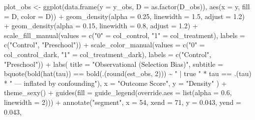 \documentclass[
  letterpaper,
  DIV=11,
  numbers=noendperiod]{scrreprt}
\newenvironment{Shaded}{\begin{snugshade}}{\end{snugshade}}
\newcommand{\AttributeTok}[1]{\textcolor[rgb]{0.40,0.45,0.13}{#1}}
\newcommand{\DecValTok}[1]{\textcolor[rgb]{0.68,0.00,0.00}{#1}}
\newcommand{\FloatTok}[1]{\textcolor[rgb]{0.68,0.00,0.00}{#1}}
\newcommand{\FunctionTok}[1]{\textcolor[rgb]{0.28,0.35,0.67}{#1}}
\newcommand{\NormalTok}[1]{\textcolor[rgb]{0.00,0.23,0.31}{#1}}
\newcommand{\OtherTok}[1]{\textcolor[rgb]{0.00,0.23,0.31}{#1}}
\newcommand{\SpecialCharTok}[1]{\textcolor[rgb]{0.37,0.37,0.37}{#1}}
\newcommand{\StringTok}[1]{\textcolor[rgb]{0.13,0.47,0.30}{#1}}
\begin{document}
\begin{Shaded}
\begin{Highlighting}[]
\NormalTok{plot\_obs }\OtherTok{\textless{}{-}} \FunctionTok{ggplot}\NormalTok{(}\FunctionTok{data.frame}\NormalTok{(}\AttributeTok{y =}\NormalTok{ y\_obs, }\AttributeTok{D =} \FunctionTok{as.factor}\NormalTok{(D\_obs)),}
\FunctionTok{aes}\NormalTok{(}\AttributeTok{x =}\NormalTok{ y, }\AttributeTok{fill =}\NormalTok{ D, }\AttributeTok{color =}\NormalTok{ D)) }\SpecialCharTok{+}
\FunctionTok{geom\_density}\NormalTok{(}\AttributeTok{alpha =} \FloatTok{0.25}\NormalTok{, }\AttributeTok{linewidth =} \FloatTok{1.5}\NormalTok{, }\AttributeTok{adjust =} \FloatTok{1.2}\NormalTok{) }\SpecialCharTok{+}
\FunctionTok{geom\_density}\NormalTok{(}\AttributeTok{alpha =} \FloatTok{0.15}\NormalTok{, }\AttributeTok{linewidth =} \FloatTok{0.8}\NormalTok{,  }\AttributeTok{adjust =} \FloatTok{1.2}\NormalTok{) }\SpecialCharTok{+}
\FunctionTok{scale\_fill\_manual}\NormalTok{(}\AttributeTok{values =} \FunctionTok{c}\NormalTok{(}\StringTok{"0"} \OtherTok{=}\NormalTok{ col\_control,   }\StringTok{"1"} \OtherTok{=}\NormalTok{ col\_treatment),}
\AttributeTok{labels =} \FunctionTok{c}\NormalTok{(}\StringTok{"Control"}\NormalTok{, }\StringTok{"Preschool"}\NormalTok{)) }\SpecialCharTok{+}
\FunctionTok{scale\_color\_manual}\NormalTok{(}\AttributeTok{values =} \FunctionTok{c}\NormalTok{(}\StringTok{"0"} \OtherTok{=}\NormalTok{ col\_control\_dark, }\StringTok{"1"} \OtherTok{=}\NormalTok{ col\_treatment\_dark),}
\AttributeTok{labels =} \FunctionTok{c}\NormalTok{(}\StringTok{"Control"}\NormalTok{, }\StringTok{"Preschool"}\NormalTok{)) }\SpecialCharTok{+}
\FunctionTok{labs}\NormalTok{(}
\AttributeTok{title    =} \StringTok{"Observational (Selection Bias)"}\NormalTok{,}
\AttributeTok{subtitle =} \FunctionTok{bquote}\NormalTok{(}\FunctionTok{bold}\NormalTok{(}\FunctionTok{hat}\NormalTok{(tau)) }\SpecialCharTok{==} \FunctionTok{bold}\NormalTok{(.(}\FunctionTok{round}\NormalTok{(est\_obs, }\DecValTok{2}\NormalTok{))) }\SpecialCharTok{\textasciitilde{}}
\StringTok{" | true "} \SpecialCharTok{*}\NormalTok{ tau }\SpecialCharTok{==}\NormalTok{ .(tau) }\SpecialCharTok{*} \StringTok{" — inflated by confounding"}\NormalTok{),}
\AttributeTok{x =} \StringTok{"Outcome Score"}\NormalTok{, }\AttributeTok{y =} \StringTok{"Density"}
\NormalTok{) }\SpecialCharTok{+}
\FunctionTok{theme\_sexy}\NormalTok{() }\SpecialCharTok{+}
\FunctionTok{guides}\NormalTok{(}\AttributeTok{fill =} \FunctionTok{guide\_legend}\NormalTok{(}\AttributeTok{override.aes =} \FunctionTok{list}\NormalTok{(}\AttributeTok{alpha =} \FloatTok{0.6}\NormalTok{, }\AttributeTok{linewidth =} \DecValTok{2}\NormalTok{))) }\SpecialCharTok{+}
\FunctionTok{annotate}\NormalTok{(}\StringTok{"segment"}\NormalTok{, }\AttributeTok{x =} \DecValTok{54}\NormalTok{, }\AttributeTok{xend =} \DecValTok{71}\NormalTok{, }\AttributeTok{y =} \FloatTok{0.043}\NormalTok{, }\AttributeTok{yend =} \FloatTok{0.043}\NormalTok{,}

\end{Highlighting}
\end{Shaded}
\end{document}
